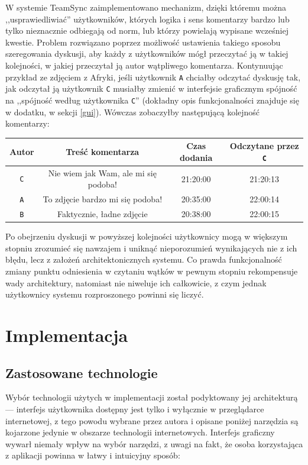 \documentclass[polish,a4paper,twoside]{ppfcmthesis}
\begin{document}
W systemie TeamSync zaimplementowano mechanizm, dzięki któremu można ,,usprawiedliwiać'' użytkowników, których logika i sens komentarzy bardzo lub tylko nieznacznie odbiegają od norm, lub którzy powielają wypisane wcześniej kwestie. Problem rozwiązano poprzez możliwość ustawienia takiego sposobu szeregowania dyskusji, aby każdy z użytkowników mógł przeczytać ją w takiej kolejności, w jakiej przeczytał ją autor wątpliwego komentarza. Kontynuując przykład ze zdjęciem z Afryki, jeśli użytkownik \texttt{A} chciałby odczytać dyskusję tak, jak odczytał ją użytkownik \texttt{C} musiałby zmienić w interfejsie graficznym spójność na ,,spójność według użytkownika \texttt{C}'' (dokładny opis funkcjonalności znajduje się w dodatku, w sekcji \ref{gui}). Wówczas zobaczyłby następującą kolejność komentarzy:

\vspace{5px}
\begin{center}
\begin{tabular}{c | c | c | c}
 \textbf{Autor} & \textbf{Treść komentarza} & \textbf{Czas dodania} & \textbf{Odczytane przez \texttt{C}}\\
 \hline
 \texttt{C} & Nie wiem jak Wam, ale mi się podoba! & 21:20:00 & 21:20:13 \\
 \texttt{A} & To zdjęcie bardzo mi się podoba! & 20:35:00 & 22:00:14 \\
 \texttt{B} & Faktycznie, ładne zdjęcie & 20:38:00 & 22:00:15
\end{tabular}
\end{center}
\vspace{5px}

Po obejrzeniu dyskusji w powyższej kolejności użytkownicy mogą w większym stopniu zrozumieć się nawzajem i uniknąć nieporozumień wynikających nie z ich błędu, lecz z założeń architektonicznych systemu. Co prawda funkcjonalność zmiany punktu odniesienia w czytaniu wątków w pewnym stopniu rekompensuje wady architektury, natomiast nie niweluje ich całkowicie, z czym jednak użytkownicy systemu rozproszonego powinni się liczyć.

\chapter{Implementacja}

\section{Zastosowane technologie}

Wybór technologii użytych w implementacji został podyktowany jej architekturą --- interfejs użytkownika dostępny jest tylko i wyłącznie w przeglądarce internetowej, z tego powodu wybrane przez autora i opisane poniżej narzędzia są kojarzone jedynie w obszarze technologii internetowych. Interfejs graficzny wywarł niemały wpływ na wybór narzędzi, z uwagi na fakt, że osoba korzystająca z aplikacji powinna w łatwy i intuicyjny sposób:
\end{document}
